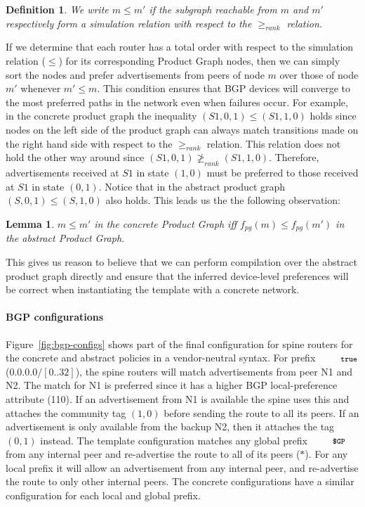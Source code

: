 \documentclass[numbers, 10pt, preprint]{sigplanconf}
\newcommand{\para}[1]{\paragraph*{\textbf{#1}}}
\newcommand{\CD}[1]{\texttt{\small #1}}  %
\newcommand{\True}{\CD{true}}
\newtheorem{defn}{Definition}
\newtheorem{lem}[thm]{Lemma}
\begin{document}
\begin{defn}
We write $m \leq m'$ if the subgraph reachable from $m$ and $m'$ respectively form a simulation relation with respect to the $\geq_{rank}$ relation.
\end{defn}

If we determine that each router has a total order with respect to the simulation relation ($\leq$) for its corresponding Product Graph nodes, then we can simply sort the nodes and prefer advertisements from peers of node $m$ over those of node $m'$ whenever $m' \leq m$. This condition ensures that BGP devices will converge to the most preferred paths in the network even when failures occur.
%
For example, in the concrete product graph the inequality $(S1,0,1) \leq (S1,1,0)$ holds since nodes on the left side of the product graph can always match transitions made on the right hand side with respect to the $\geq_{rank}$ relation. This relation does not hold the other way around since $(S1,0,1) \ngeq_{rank} (S1,1,0)$. Therefore, advertisements received at $S1$ in state $(1,0)$ must be preferred to those received at $S1$ in state $(0,1)$.
%
Notice that in the abstract product graph $(S,0,1) \leq (S,1,0)$ also holds. This leads us the the following observation:

\begin{lem}
\label{lem:preference}
$m \leq m'$ in the concrete Product Graph iff $f_{pg}(m) \leq f_{pg}(m')$ in the abstract Product Graph.
\end{lem}

This gives us reason to believe that we can perform compilation over the abstract product graph directly and ensure that the inferred device-level preferences will be correct when instantiating the template with a concrete network.



\para{BGP configurations}

Figure~\ref{fig:bgp-configs} shows part of the final configuration for spine routers for the concrete and abstract policies in a vendor-neutral syntax.
%
For prefix $\True$ ($0.0.0.0/[0..32]$), the spine routers will match advertisements from peer N1 and N2. The match for N1 is preferred since it has a higher BGP local-preference attribute (110). If an advertisement from N1 is available the spine uses this and attaches the community tag $(1,0)$ before sending the route to all its peers. If an advertisement is only available from the backup N2, then it attaches the tag $(0,1)$ instead.
%
The template configuration matches any global prefix $\CD{\$GP}$ from any internal peer and re-advertise the route to all of its peers ($*$). For any local prefix it will allow an advertisement from any internal peer, and re-advertise the route to only other internal peers. The concrete configurations have a similar configuration for each local and global prefix.
\end{document}
